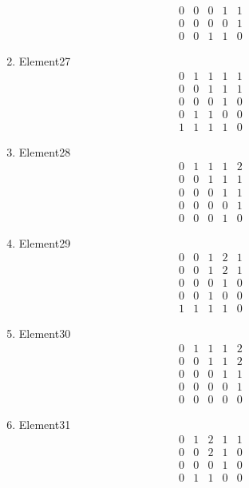 \documentclass[12pt]{article}
\begin{document}
\begin{multicols}{3}
\begin{enumerate}
\begin{equation*}
\begin{array}{ccccc}
0&0&0&1&1\\
0&0&0&0&1\\
0&0&1&1&0
\end{array}
\end{equation*}
\item Element27
\begin{equation*}
\begin{array}{ccccc}
0&1&1&1&1\\
0&0&1&1&1\\
0&0&0&1&0\\
0&1&1&0&0\\
1&1&1&1&0
\end{array}
\end{equation*}
\item Element28
\begin{equation*}
\begin{array}{ccccc}
0&1&1&1&2\\
0&0&1&1&1\\
0&0&0&1&1\\
0&0&0&0&1\\
0&0&0&1&0
\end{array}
\end{equation*}
\item Element29
\begin{equation*}
\begin{array}{ccccc}
0&0&1&2&1\\
0&0&1&2&1\\
0&0&0&1&0\\
0&0&1&0&0\\
1&1&1&1&0
\end{array}
\end{equation*}
\item Element30
\begin{equation*}
\begin{array}{ccccc}
0&1&1&1&2\\
0&0&1&1&2\\
0&0&0&1&1\\
0&0&0&0&1\\
0&0&0&0&0
\end{array}
\end{equation*}
\item Element31
\begin{equation*}
\begin{array}{ccccc}
0&1&2&1&1\\
0&0&2&1&0\\
0&0&0&1&0\\
0&1&1&0&0\\

\end{array}
\end{equation*}
\end{enumerate}
\end{multicols}
\end{document}
